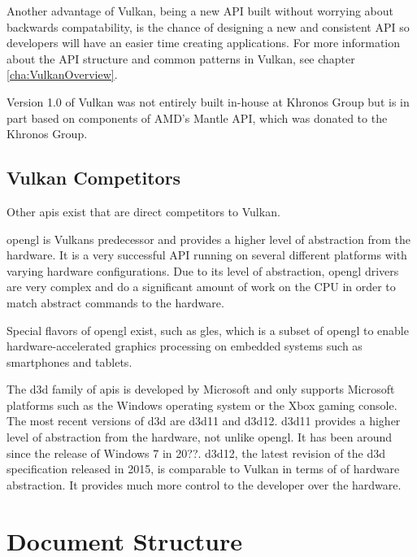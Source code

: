     Another advantage of Vulkan, being a new API built without worrying about backwards compatability, is the chance of designing a new and consistent API so developers will have an easier time creating applications. For more information about the API structure and common patterns in Vulkan, see chapter \ref{cha:VulkanOverview}.

    Version 1.0 of Vulkan was not entirely built in-house at Khronos Group but is in part based on components of AMD's Mantle API, which was donated to the Khronos Group.


    \subsection{Vulkan Competitors}

      Other \glspl{api} exist that are direct competitors to Vulkan.

      \gls{opengl} is Vulkans predecessor and provides a higher level of abstraction from the hardware. It is a very successful API running on several different platforms with varying hardware configurations. Due to its level of abstraction, \gls{opengl} drivers are very complex and do a significant amount of work on the CPU in order to match abstract commands to the hardware.

      Special flavors of \gls{opengl} exist, such as \gls{gles}, which is a subset of \gls{opengl} to enable hardware-accelerated graphics processing on embedded systems such as smartphones and tablets.

      The \gls{d3d} family of \glspl{api} is developed by Microsoft and only supports Microsoft platforms such as the Windows operating system or the Xbox gaming console. The most recent versions of \gls{d3d} are \acrlong{d3d11} and \acrlong{d3d12}. \acrlong{d3d11} provides a higher level of abstraction from the hardware, not unlike \gls{opengl}. It has been around since the release of Windows 7 in 20??. \acrlong{d3d12}, the latest revision of the \gls{d3d} specification released in 2015, is comparable to Vulkan in terms of of hardware abstraction. It provides much more control to the developer over the hardware.





  \section{Document Structure}

    \tbd
